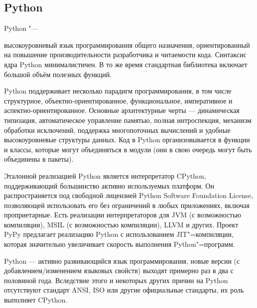 \documentclass[14pt]{beamer}
\begin{document}
{\subsection{Python}
\begin{frame}[label=Python]
\begin{block}{Python "---}

высокоуровневый язык программирования общего назначения, ориентированный на повышение производительности разработчика и читаемости кода. Синтаксис ядра Python минималистичен. В то же время стандартная библиотека включает большой объём полезных функций.
\end{block}
\end{frame}

\begin{frame}[shrink=10]
\begin{block}

Python поддерживает несколько парадигм программирования, в том числе структурное, объектно-ориентированное, функциональное, императивное и аспектно-ориентированное. Основные архитектурные черты — динамическая типизация, автоматическое управление памятью, полная интроспекция, механизм обработки исключений, поддержка многопоточных вычислений и удобные высокоуровневые структуры данных. Код в Python организовывается в функции и классы, которые могут объединяться в модули (они в свою очередь могут быть объединены в пакеты).
\end{block}
\end{frame}

\begin{frame}[shrink=10]
\begin{block}{}
Эталонной реализацией Python является интерпретатор CPython, поддерживающий большинство активно используемых платформ. Он распространяется под свободной лицензией Python Software Foundation License, позволяющей использовать его без ограничений в любых приложениях, включая проприетарные. Есть реализации интерпретаторов для JVM (с возможностью компиляции), MSIL (с возможностью компиляции), LLVM и других. Проект PyPy предлагает реализацию Python с использованием JIT"=компиляции, которая значительно увеличивает скорость выполнения Python"=программ.
\end{block}
\end{frame}

\begin{frame}
\begin{block}

Python — активно развивающийся язык программирования, новые версии (с добавлением/изменением языковых свойств) выходят примерно раз в два с половиной года. Вследствие этого и некоторых других причин на Python отсутствуют стандарт ANSI, ISO или другие официальные стандарты, их роль выполняет CPython.
\end{block}
\end{frame}
}
\end{document}
